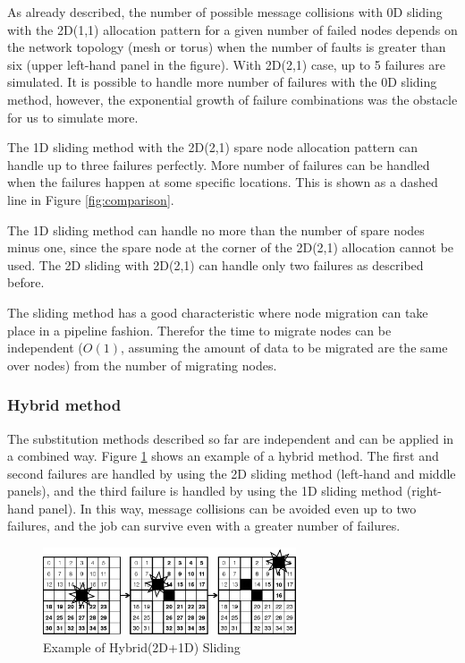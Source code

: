 \documentclass[Afour,times,sagev]{sagej}
\begin{document}
As already described, the number of
possible message collisions with 0D sliding with the 2D(1,1)
allocation pattern for a given number of failed nodes depends on the
network topology (mesh or torus) when the number of faults is greater
than six (upper left-hand panel in the figure). With 2D(2,1) case, up
to 5 failures are simulated. It is possible to handle more number of
failures with the 0D sliding method, however, the exponential growth
of failure combinations was the obstacle for us to simulate more.

The 1D sliding method with the 2D(2,1) spare node allocation pattern
can handle up to three failures perfectly. More number of failures can
be handled when the failures happen at some specific locations. This
is shown as a dashed line in Figure \ref{fig:comparison}.

The 1D sliding method can handle no more than the number of
spare nodes minus one, since the spare node at the corner of the
2D(2,1) allocation cannot be used. The 2D sliding with 2D(2,1) can
handle only two failures as described before.

The sliding method has a good characteristic where node migration can
take place in a pipeline fashion. Therefor the time to migrate nodes
can be independent ($O(1)$, assuming the amount of data to be migrated
are the same over nodes) from the number of migrating nodes.

\subsubsection*{Hybrid method}

The substitution methods described so far are independent and can be
applied in a combined way. Figure \ref{fig:hybrid-sliding} shows an
example of a hybrid method. The first and second failures are handled
by using the 2D sliding method (left-hand and middle panels), and the
third failure is handled by using the 1D sliding method (right-hand
panel). In this way, message collisions can be avoided even up to two
failures, and the job can survive even with a greater number of
failures.

\begin{figure}[ht]
\centering
\includegraphics[width=75mm]{Figs/Hybrid.eps}
  \caption{Example of Hybrid(2D+1D) Sliding}
  \label{fig:hybrid-sliding}
\end{figure}
\end{document}
